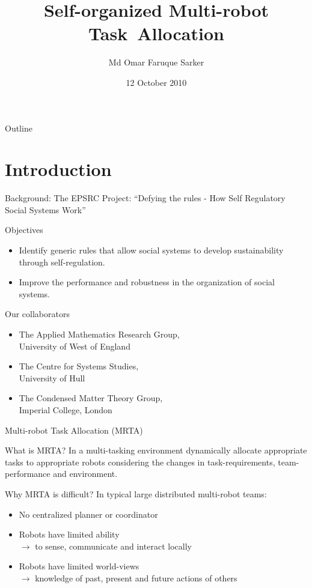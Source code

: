 \documentclass{beamer}
\title[Self-organized Multi-robot Task~Allocation] 
{%
  Self-organized Multi-robot Task~Allocation%
}
\author[MOFSarker]
{
  Md Omar Faruque Sarker
}
\institute[UWN]
{
 PhD Student\\
 Cognitive Robotics Research Centre\\
 Newport Business School\\
 University of Wales, Newport
}
\date{12 October 2010}
\begin{document}
\begin{frame}
  \titlepage
\end{frame}

\begin{frame}{Outline}
  \tableofcontents
\end{frame}
\section{Introduction}
\begin{frame}[t]{Background: The EPSRC Project: ``Defying the rules - How Self Regulatory Social Systems Work''}
\begin{block}{Objectives}
\begin{itemize}
\item Identify generic rules that allow social systems to develop sustainability through self-regulation.
\item Improve the performance and robustness in the organization of social systems. 
\end{itemize}
\end{block}
\begin{block}{Our collaborators}
\begin{itemize}
\item The Applied Mathematics Research Group,\\ \alert{University of West of England}
\item The Centre for Systems Studies,\\ \alert{University of Hull}
\item The Condensed Matter Theory Group,\\ \alert{ Imperial College, London}
\end{itemize}
\end{block}
\end{frame}
\begin{frame}[t]{Multi-robot Task Allocation (MRTA)}
	
\begin{block}{What is MRTA?}
In a multi-tasking environment dynamically allocate appropriate tasks to appropriate robots considering the  changes in \alert{task-requirements, team-performance and environment.}
\end{block}
  	
\begin{block}{Why MRTA is difficult?}
In typical large distributed multi-robot teams:
\begin{itemize}
\item No centralized planner or coordinator
\item \alert{Robots have limited ability}\\
$\rightarrow$ \small to sense, communicate and interact locally
\item \normalsize \alert{Robots have limited world-views}\\ 
$\rightarrow$ \small knowledge of past, present and future actions of others
\end{itemize}
\end{block}
  	
\end{frame}
\end{document}
